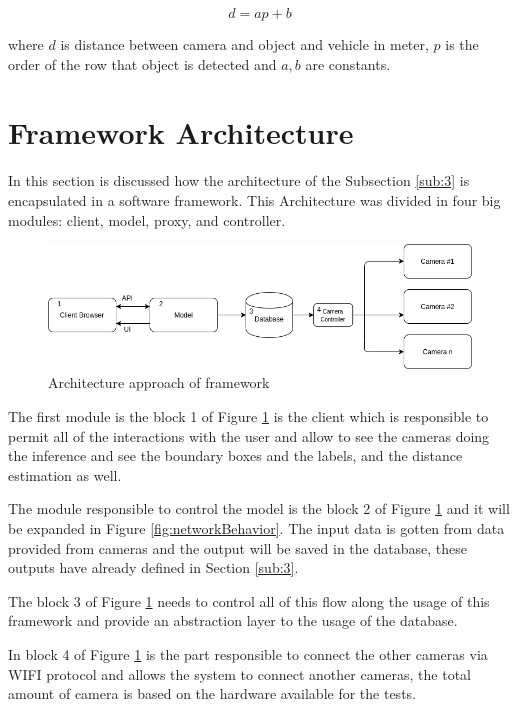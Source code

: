 \begin{equation}
    \label{eq:eq4}
    d = ap+b
\end{equation}

where $d$ is distance between camera and object and vehicle in meter, $p$ is the order of the row that object is detected and $a, b$ are constants.

 
\section{Framework Architecture} \label{framework}

In this section is discussed how the architecture of the Subsection \ref{sub:3} is encapsulated in a software framework. This Architecture was divided in four big modules: client, model, proxy, and controller. 



\begin{figure}[H]
\centering
\includegraphics[scale=0.6]{imagens/diagram.png}
\caption{Architecture approach of framework}
\label{fig:framework}
\end{figure}

The first module is the block 1 of Figure \ref{fig:framework} is the client which is responsible to permit all of the interactions with the user and allow to see the cameras doing the inference and see the boundary boxes and the labels, and the distance estimation as well.

The module responsible to control the model is the block 2 of Figure \ref{fig:framework} and it will be expanded in Figure \ref{fig:networkBehavior}. The input data is gotten from data provided from cameras and the output will be saved in the database, these outputs have already defined in Section \ref{sub:3}. 

The block 3 of Figure \ref{fig:framework} needs to control all of this flow along the usage of this framework and provide an abstraction layer to the usage of the database. 

In block 4 of Figure \ref{fig:framework} is the part responsible to connect the other cameras via WIFI protocol and allows the system to connect another cameras, the total amount of camera is based on the hardware available for the tests. 


